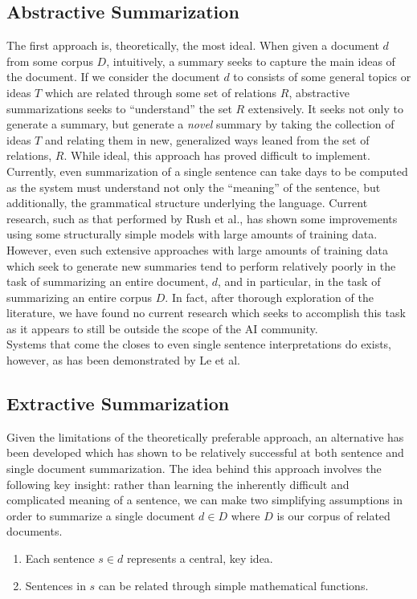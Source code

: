 \documentclass[11pt]{article}
\begin{document}
\subsection{Abstractive Summarization}
The first approach is, theoretically, the most ideal. When given a document $d$ from some corpus $D$, intuitively, a summary seeks to capture the main ideas of the document. If we consider the document $d$ to consists of some general topics or ideas $T$ which are related through some set of relations $R$, abstractive summarizations seeks to ``understand'' the set $R$ extensively. It seeks not only to generate a summary, but generate a \textit{novel} summary by taking the collection of ideas $T$ and relating them in new, generalized ways leaned from the set of relations, $R$. While ideal, this approach has proved difficult to implement. \\

Currently, even summarization of a single sentence can take days to be computed as the system must understand not only the ``meaning'' of the sentence, but additionally, the grammatical structure underlying the language. Current research, such as that performed by Rush et al., has shown some improvements using some structurally simple models with large amounts of training data. However, even such extensive approaches with large amounts of training data which seek to generate new summaries tend to perform relatively poorly in the task of summarizing an entire document, $d$, and in particular, in the task of summarizing an entire corpus $D$. In fact, after thorough exploration of the literature, we have found no current research which seeks to accomplish this task as it appears to still be outside the scope of the AI community. \\

Systems that come the closes to even single sentence interpretations do exists, however, as has been demonstrated by  Le et al.

\subsection{Extractive Summarization}
Given the limitations of the theoretically preferable approach, an alternative has been developed which has shown to be relatively successful at both sentence  \cite{sentence_summary} and single document summarization. The idea behind this approach involves the following key insight: rather than learning the inherently difficult and complicated meaning of a sentence, we can make two simplifying assumptions in order to summarize a single document $d \in D$ where $D$ is our corpus of related documents.
\begin{enumerate}
\item Each sentence $s \in d$ represents a central, key idea.
\item Sentences in $s$ can be related through simple mathematical functions.
\end{enumerate}
\end{document}
